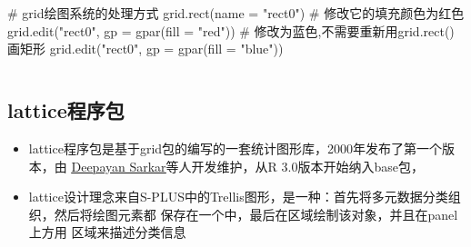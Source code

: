 \begin{frame}[t,fragile]{\subsecname}{}
\begin{overlayarea}{\textwidth}{\textheight}
\begin{onlyenv}
\begin{columns}
  \begin{column}[t]{.5\textwidth}
    \begin{rcode}
# grid绘图系统的处理方式
grid.rect(name = "rect0")
# 修改它的填充颜色为红色
grid.edit("rect0", gp = gpar(fill = "red"))
# 修改为蓝色,不需要重新用grid.rect()画矩形
grid.edit("rect0", gp = gpar(fill = "blue"))
    \end{rcode} 
  \end{column}
\end{columns} 
\end{onlyenv}

\end{overlayarea}
\end{frame} 

\subsection{lattice程序包}
\begin{frame}[t,fragile]{\subsecname}{}
\begin{itemize}
\item lattice程序包是基于grid包的编写的一套统计图形库，2000年发布了第一个版本，由
\href{https://www.isid.ac.in/~deepayan/}{\uline{Deepayan Sarkar}}等人开发维护，从R 3.0版本开始纳入base包，
\item lattice设计理念来自S-PLUS中的Trellis图形，是一种：首先将多元数据分类组织，然后将绘图元素都 保存在一个中，最后在区域绘制该对象，并且在panel上方用
区域来描述分类信息
\end{itemize}

\vspace{-8pt}
\begin{overlayarea}{\textwidth}{\textheight}


\end{overlayarea}  
\end{frame} 

